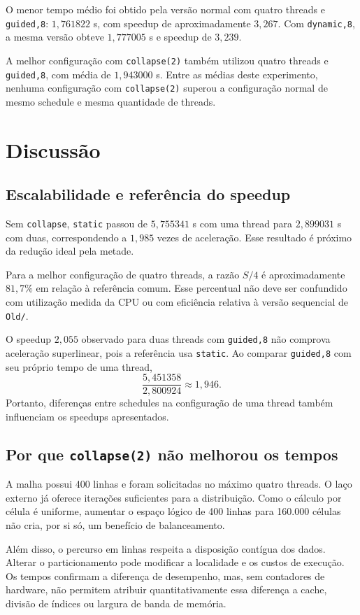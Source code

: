 \documentclass[12pt,a4paper]{article}
\begin{document}
O menor tempo médio foi obtido pela versão normal com quatro threads e \texttt{guided,8}: $1{,}761822$ s, com speedup de aproximadamente $3{,}267$. Com \texttt{dynamic,8}, a mesma versão obteve $1{,}777005$ s e speedup de $3{,}239$.

A melhor configuração com \texttt{collapse(2)} também utilizou quatro threads e \texttt{guided,8}, com média de $1{,}943000$ s. Entre as médias deste experimento, nenhuma configuração com \texttt{collapse(2)} superou a configuração normal de mesmo schedule e mesma quantidade de threads.

\section{Discussão}
\subsection{Escalabilidade e referência do speedup}
Sem \texttt{collapse}, \texttt{static} passou de $5{,}755341$ s com uma thread para $2{,}899031$ s com duas, correspondendo a $1{,}985$ vezes de aceleração. Esse resultado é próximo da redução ideal pela metade.

Para a melhor configuração de quatro threads, a razão $S/4$ é aproximadamente $81{,}7\%$ em relação à referência comum. Esse percentual não deve ser confundido com utilização medida da CPU ou com eficiência relativa à versão sequencial de \texttt{Old/}.

O speedup $2{,}055$ observado para duas threads com \texttt{guided,8} não comprova aceleração superlinear, pois a referência usa \texttt{static}. Ao comparar \texttt{guided,8} com seu próprio tempo de uma thread,
\[
\frac{5{,}451358}{2{,}800924}\approx1{,}946.
\]
Portanto, diferenças entre schedules na configuração de uma thread também influenciam os speedups apresentados.

\subsection{Por que \texttt{collapse(2)} não melhorou os tempos}
A malha possui 400 linhas e foram solicitadas no máximo quatro threads. O laço externo já oferece iterações suficientes para a distribuição. Como o cálculo por célula é uniforme, aumentar o espaço lógico de 400 linhas para 160.000 células não cria, por si só, um benefício de balanceamento.

Além disso, o percurso em linhas respeita a disposição contígua dos dados. Alterar o particionamento pode modificar a localidade e os custos de execução. Os tempos confirmam a diferença de desempenho, mas, sem contadores de hardware, não permitem atribuir quantitativamente essa diferença a cache, divisão de índices ou largura de banda de memória.
\end{document}
